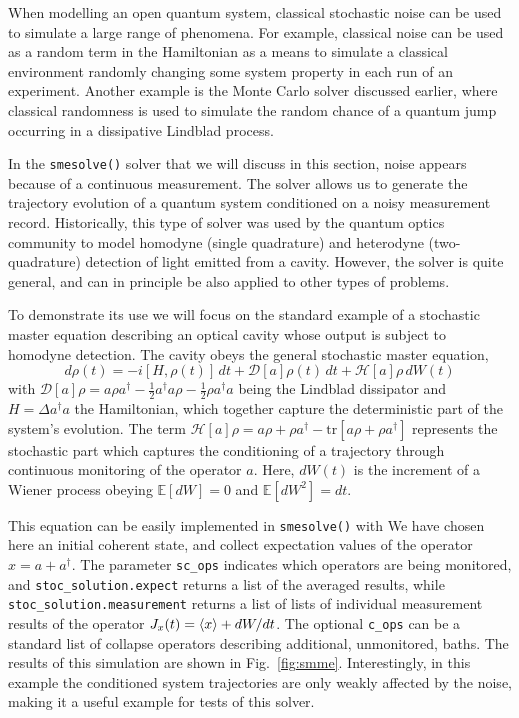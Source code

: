 \documentclass[preprint,3p,sort&compress]{elsarticle}
\def\code#1{\texttt{#1}}
\newcommand{\fig}[1]{Fig.~\ref{#1}}
\DeclarePairedDelimiter{\ex}{\langle}{\rangle}
\begin{document}
When modelling an open quantum system, classical stochastic noise can be used to simulate a large range of phenomena. For example, classical noise can be used as a random term in the Hamiltonian as a means to simulate a classical environment randomly changing some system property in each run of an experiment. Another example is the Monte Carlo solver discussed earlier, where classical randomness is used to simulate the random chance of a quantum jump occurring in a dissipative Lindblad process. 

In the \code{smesolve()} solver that we will discuss in this section, noise appears because of a continuous measurement. The solver allows us to generate the trajectory evolution of a quantum system conditioned on a noisy measurement record.  Historically, this type of solver was used by the quantum optics community to model homodyne (single quadrature) and heterodyne (two-quadrature) detection of light emitted from a cavity. However, the solver is quite general, and can in principle be also applied to other types of problems.

To demonstrate its use we will focus on the standard example of a stochastic master equation describing an optical cavity whose output is subject to homodyne detection. 
The cavity obeys the general stochastic master equation,
\begin{equation}
d \rho(t) = -i [H,\rho(t)]\, dt + \mathcal D[a]\rho(t)\, dt + \mathcal{H}[a]\rho\, dW(t)
\end{equation}
with $\mathcal D[a] \rho = a\rho a^{\dagger} - \frac{1}{2}a^{\dagger}a \rho - \frac{1}{2}\rho a^{\dagger}a$ being the Lindblad dissipator and $H=\Delta a^{\dagger}a$ the Hamiltonian, which together capture the deterministic part of the system's evolution. The term $\mathcal{H}[a] \rho = a\rho + \rho a^{\dagger} - \mathrm{tr}\left[a\rho + \rho a^{\dagger}\right]$ represents the stochastic part which captures the conditioning of a trajectory through continuous monitoring of the operator $a$.
Here, $dW(t)$ is the increment of a Wiener process obeying $\mathbb E[dW]=0$ and $\mathbb E[dW^2]=dt$.

This equation can be easily implemented in \code{smesolve()} with
\newpage
{}
%
We have chosen here an initial coherent state, and collect expectation values of the operator $x=a+a^{\dagger}$.  The parameter \code{sc\_ops} indicates which operators are being monitored, and \code{stoc\_solution.expect} returns a list of the averaged results, while \code{stoc\_solution.measurement} returns a list of lists of individual measurement results of the operator $J_x(t) = \ex{x} + dW/dt$. The optional \code{c\_ops} can be a standard list of collapse operators describing additional, unmonitored, baths. The results of this simulation are shown in \fig{fig:smme}. Interestingly, in this example the conditioned system trajectories are only weakly affected by the noise, making it a 
  useful example for tests of this solver.
\end{document}
